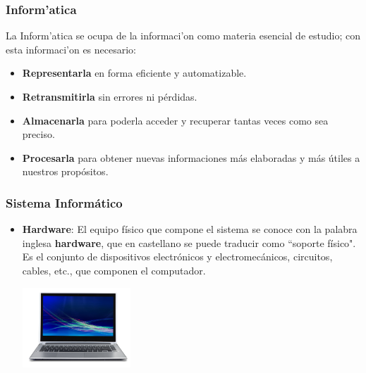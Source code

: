 \documentclass{beamer}
\begin{document}
\begin{frame}[fragile]\frametitle{Inform'atica}
La Inform'atica se ocupa de la informaci'on como materia esencial de estudio; con esta informaci'on es necesario:
\begin{itemize}
\item \textbf{Representarla} en forma eficiente y automatizable.
\item \textbf{Retransmitirla} sin errores ni pérdidas.
\item \textbf{Almacenarla} para poderla acceder y recuperar tantas veces como sea preciso.
\item \textbf{Procesarla} para obtener nuevas informaciones más elaboradas y más útiles a nuestros propósitos.
\end{itemize}
\end{frame}

\begin{frame}[fragile]\frametitle{Sistema Informático}
\begin{itemize}
\item \textbf{Hardware}: El equipo físico que compone el sistema se conoce con la palabra inglesa \textbf{hardware}, que en castellano se puede traducir como ``soporte físico". Es el conjunto de dispositivos electrónicos y electromecánicos, circuitos, cables, etc., que componen el computador.
\begin{center}
\includegraphics[height=3cm]{figs/notebook.jpg}
\end{center}
\end{itemize}
\end{frame}
\end{document}
